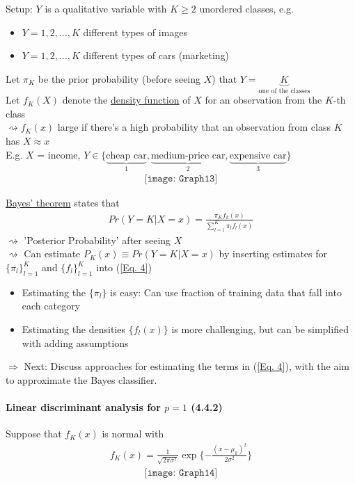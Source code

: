 \documentclass[11pt,a4paper,numbers=endperiod]{scrartcl}
\begin{document}
{Setup: $Y$ is a qualitative variable with $K \geq 2$ unordered classes, e.g. \begin{itemize}
	\item $Y = 1, 2, \ldots, K$ different types of images
	\item $Y = 1, 2, \ldots, K$ different types of cars (marketing) 
\end{itemize}
Let $\pi_K$ be the prior probability (before seeing $X$) that $Y = \underbrace{K}_{\text{one of the classes}}$\\
Let $f_K(X)$ denote the \underline{density function} of $X$ for an observation from the $K$-th class\\
$\rightsquigarrow f_K(x)$ large if there's a high probability that an observation from class $K$ has $X \approx x$\\ 
E.g. $X$ = income, $Y \in \{\underbrace{\text{cheap car}}_1, \underbrace{\text{medium-price car}}_2, \underbrace{\text{expensive car}}_3\}$
\begin{align*}
	\texttt{[image: Graph13]}
\end{align*}
	
\underline{Bayes' theorem} states that \begin{align}
	Pr(Y = K| X = x) = \frac{\pi_K f_k(x)}{\sum\limits_{l = 1}^K \pi_l f_l(x)}  \label{Eq. 4}
\end{align}	
$\rightsquigarrow$ 'Posterior Probability' after seeing $X$\\
$\rightsquigarrow$ Can estimate $P_K(x) \equiv Pr(Y = K|X = x)$ by inserting estimates for $\{\pi_l\}_{l = 1}^K$ and $\{f_l\}_{l = 1}^K$ into (\ref*{Eq. 4})
\begin{itemize}
	\item Estimating the $\{\pi_l\}$ is easy: Can use fraction of training data that fall into each category
	\item Estimating the densities $\{f_l(x)\}$ is more challenging, but can be simplified with adding assumptions
\end{itemize}
$\Rightarrow$ Next: Discuss approaches for estimating the terms in (\ref*{Eq. 4}), with the aim to approximate the Bayes classifier.\\

\paragraph{Linear discriminant analysis for $p = 1$ (4.4.2)}
$ $\\

Suppose that $f_K(x)$ is normal with \begin{align*}
	f_K(x) = \frac{1}{\sqrt{2 \pi \sigma^2}} \exp\{- \frac{(x - \mu_k)^2}{2 \sigma^2}\}
\end{align*}	
\begin{align*}
	\texttt{[image: Graph14]}
\end{align*}

}
\end{document}
